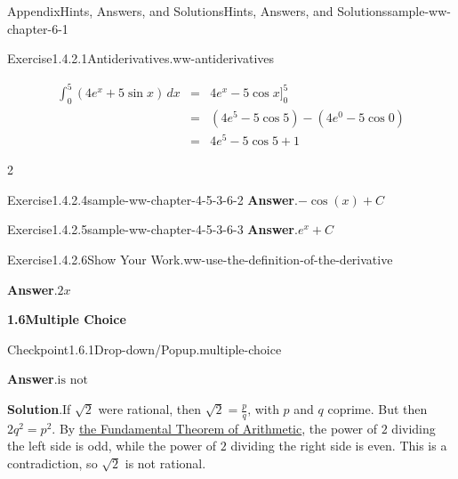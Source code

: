 \documentclass[oneside,10pt,]{book}
\newcommand{\blocktitlefont}{\relax}
\numberwithin{equation}{section}
\newcommand{\amp}{&}
\begin{document}
\begin{solutions-chapter}{Appendix}{Hints, Answers, and Solutions}{}{Hints, Answers, and Solutions}{}{}{sample-ww-chapter-6-1}
\begin{divisionsolution}{Exercise}{1.4.2.1}{Antiderivatives.}{ww-antiderivatives}
\par
%
\begin{equation*}
\begin{array}{rcl} \displaystyle \int_0^{5} (4 e^x+5 \sin x)\, dx \amp =\amp   
\displaystyle  4 e^x-5 \cos x  \Big]_0^{5}
\\ \amp =\amp  (4 e^{5} - 5 \cos 5) - (4 e^0 - 5 \cos0 ) 
\\ \amp =\amp  4 e^{5} - 5 \cos 5  + 1 
\end{array}
\end{equation*}
%
\end{divisionsolution}%
\begin{exercisegroupcol}{2}
\begin{divisionsolutionegcol}{Exercise}{1.4.2.4}{}{sample-ww-chapter-4-5-3-6-2}%
\noindent\textbf{\blocktitlefont Answer}.\hypertarget{sample-ww-chapter-4-5-3-6-2-2-back}{}\quad{}\(-\cos\!\left(x\right)+C\)%
\end{divisionsolutionegcol}%
\begin{divisionsolutionegcol}{Exercise}{1.4.2.5}{}{sample-ww-chapter-4-5-3-6-3}%
\noindent\textbf{\blocktitlefont Answer}.\hypertarget{sample-ww-chapter-4-5-3-6-3-2-back}{}\quad{}\(e^{x}+C\)%
\end{divisionsolutionegcol}%
\end{exercisegroupcol}
\par\medskip\noindent
\begin{divisionsolution}{Exercise}{1.4.2.6}{Show Your Work.}{ww-use-the-definition-of-the-derivative}%
\par\smallskip%
\noindent\textbf{\blocktitlefont Answer}.\hypertarget{ww-use-the-definition-of-the-derivative-3-back}{}\quad{}\(2x\)%
\end{divisionsolution}%
\par\medskip
\noindent\textbf{\Large{}1.6\space\textperiodcentered\space{}Multiple Choice}
\begin{inlinesolution}{Checkpoint}{1.6.1}{Drop-down\slash{}Popup.}{multiple-choice}%
\par\smallskip%
\noindent\textbf{\blocktitlefont Answer}.\hypertarget{multiple-choice-3-back}{}\quad{}\(\text{is not}\)%
\par\smallskip%
\noindent\textbf{\blocktitlefont Solution}.\hypertarget{multiple-choice-4-back}{}\quad{}If \(\sqrt{2}\) were rational, then \(\sqrt{2}=\frac{p}{q}\text{,}\) with \(p\) and \(q\) coprime. But then \(2q^2=p^2\text{.}\) By \href{https://en.wikipedia.org/wiki/Fundamental_theorem_of_arithmetic\#Canonical_representation_of_a_positive_integer}{the Fundamental Theorem of Arithmetic}\footnotemark{}, the power of \(2\) dividing the left side is odd, while the power of \(2\) dividing the right side is even. This is a contradiction, so \(\sqrt{2}\) is not rational.%

\end{inlinesolution}
\end{solutions-chapter}
\end{document}
